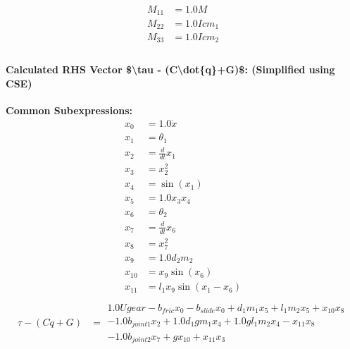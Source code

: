 \documentclass{article}%
\begin{document}
%
\begin{align*}%
M_{11} &= 1.0 M \\%
M_{22} &= 1.0 Icm_{1} \\%
M_{33} &= 1.0 Icm_{2} \\%
\end{align*}%
\vspace{1em}%
\paragraph{\textbf{Calculated RHS Vector \$\textbackslash{}tau {-} (C\textbackslash{}dot\{q\}+G)\$: (Simplified using CSE)}}%
\label{para:textbfCalculatedRHSVectortextbackslashtau{-}(Ctextbackslashdotq+G)(SimplifiedusingCSE)}%

%
\textbf{Common Subexpressions:}\\ \vspace{0.5em}%
\begin{align*}%
x_{0} &= \displaystyle 1.0 \dot{x} \\%
x_{1} &= \displaystyle \theta_1 \\%
x_{2} &= \displaystyle \frac{d}{d t} x_{1} \\%
x_{3} &= \displaystyle x_{2}^{2} \\%
x_{4} &= \displaystyle \sin(x_{1} ) \\%
x_{5} &= \displaystyle 1.0 x_{3} x_{4} \\%
x_{6} &= \displaystyle \theta_2 \\%
x_{7} &= \displaystyle \frac{d}{d t} x_{6} \\%
x_{8} &= \displaystyle x_{7}^{2} \\%
x_{9} &= \displaystyle 1.0 d_{2} m_{2} \\%
x_{10} &= \displaystyle x_{9} \sin(x_{6} ) \\%
x_{11} &= \displaystyle l_{1} x_{9} \sin(x_{1} - x_{6} ) \\%
\end{align*}%
\vspace{1em}%
\begin{align*}%
\tau - (C\dot{q}+G) &= \displaystyle \begin{matrix}1.0 U gear - b_{fric} x_{0} - b_{slide} x_{0} + d_{1} m_{1} x_{5} + l_{1} m_{2} x_{5} + x_{10} x_{8}\\- 1.0 b_{joint1} x_{2} + 1.0 d_{1} g m_{1} x_{4} + 1.0 g l_{1} m_{2} x_{4} - x_{11} x_{8}\\- 1.0 b_{joint2} x_{7} + g x_{10} + x_{11} x_{3}\end{matrix} \\%
\end{align*}
\end{document}
